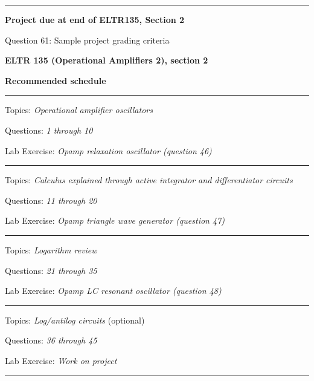 \vskip 10pt
\hrule \vskip 5pt
\noindent
{}

\hskip 10pt {\bf Project due at end of ELTR135, Section 2}
 
\hskip 10pt Question 61: Sample project grading criteria
 
\vskip 10pt







\vfil \eject

\centerline{\bf ELTR 135 (Operational Amplifiers 2), section 2} \bigskip 
 
\vskip 10pt

\noindent
{\bf Recommended schedule}

\vskip 5pt

\hrule \vskip 5pt
\noindent
{}

\hskip 10pt Topics: {\it Operational amplifier oscillators}
 
\hskip 10pt Questions: {\it 1 through 10}
 
\hskip 10pt Lab Exercise: {\it Opamp relaxation oscillator (question 46)}
 
\vskip 10pt
\hrule \vskip 5pt
\noindent
{}

\hskip 10pt Topics: {\it Calculus explained through active integrator and differentiator circuits}
 
\hskip 10pt Questions: {\it 11 through 20}
 
\hskip 10pt Lab Exercise: {\it Opamp triangle wave generator (question 47)}
 
\vskip 10pt
\hrule \vskip 5pt
\noindent
{}

\hskip 10pt Topics: {\it Logarithm review}
 
\hskip 10pt Questions: {\it 21 through 35}
 
\hskip 10pt Lab Exercise: {\it Opamp LC resonant oscillator (question 48)}
 
\vskip 10pt
\hrule \vskip 5pt
\noindent
{}

\hskip 10pt Topics: {\it Log/antilog circuits} (optional)
 
\hskip 10pt Questions: {\it 36 through 45}
 
\hskip 10pt Lab Exercise: {\it Work on project}
 
\vskip 10pt
\hrule \vskip 5pt
\noindent
{}

